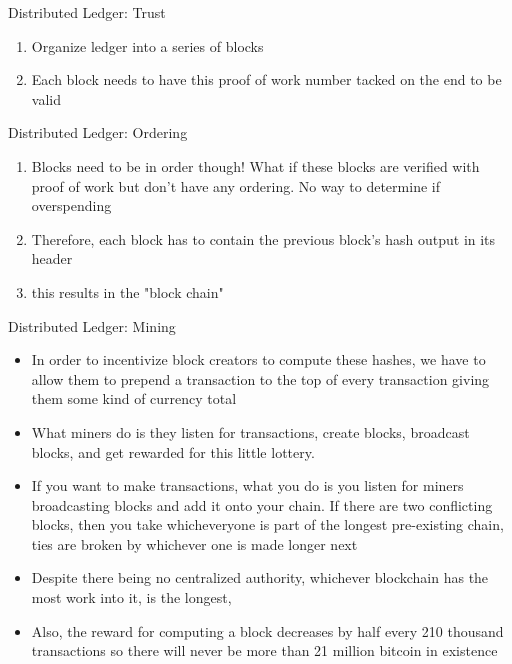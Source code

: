 \documentclass[handout]{beamer}
\begin{document}
\begin{frame}{Distributed Ledger: Trust}
    \begin{enumerate}
        \item \pause Organize ledger into a series of blocks
        \item \pause Each block needs to have this proof of work number tacked on the end to be valid
    \end{enumerate}
\end{frame}

\begin{frame}{Distributed Ledger: Ordering}
    \begin{enumerate}
        \item \pause Blocks need to be in order though! What if these blocks are verified with proof of work but don't have any ordering. No way to determine if overspending
        \item \pause Therefore, each block has to contain the previous block's hash output in its header
        \item \pause this results in the "block chain"
    \end{enumerate}
\end{frame}

\begin{frame}{Distributed Ledger: Mining}
    \begin{itemize}
        \item \pause In order to incentivize block creators to compute these hashes, we have to allow them to prepend a transaction to the top of every transaction giving them some kind of currency total
        \item \pause What miners do is they listen for transactions, create blocks, broadcast blocks, and get rewarded for this little lottery.
        \item \pause If you want to make transactions, what you do is you listen for miners broadcasting blocks and add it onto your chain. If there are two conflicting blocks, then you take whicheveryone is part of the longest pre-existing chain, ties are broken by whichever one is made longer next
        \item \pause Despite there being no centralized authority, whichever blockchain has the most work into it, is the longest, 
        \item \pause Also, the reward for computing a block decreases by half every 210 thousand transactions so there will never be more than 21 million bitcoin in existence
    \end{itemize}
\end{frame}
\end{document}
